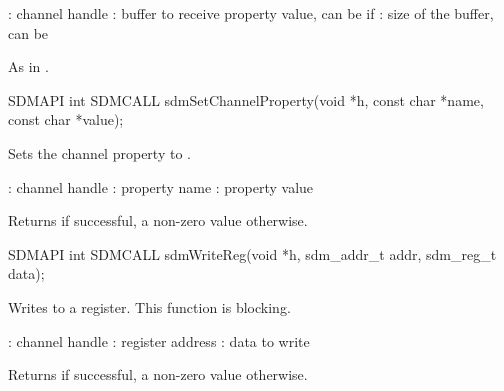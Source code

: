 \documentclass[a4paper,12pt,twoside,extrafontsizes]{memoir}
\begin{document}
\begin{funcparams}
	: channel handle
	: buffer to receive property value, can be  if 
	: size of the buffer, can be 
\end{funcparams}

\begin{funcret}
	As in .
\end{funcret}



\begin{cfuncprototype}
SDMAPI int SDMCALL sdmSetChannelProperty(void *h, const char *name, const char *value);
\end{cfuncprototype}

\begin{funcdescr}
	Sets the channel property  to .
\end{funcdescr}

\begin{funcparams}
	: channel handle
	: property name
	: property value
\end{funcparams}

\begin{funcret}
	Returns  if successful, a non-zero value otherwise.
\end{funcret}



\begin{cfuncprototype}
SDMAPI int SDMCALL sdmWriteReg(void *h, sdm_addr_t addr, sdm_reg_t data);
\end{cfuncprototype}

\begin{funcdescr}
	Writes to a register. This function is blocking.
\end{funcdescr}

\begin{funcparams}
	: channel handle
	: register address
	: data to write
\end{funcparams}

\begin{funcret}
	Returns  if successful, a non-zero value otherwise.
\end{funcret}
\end{document}
